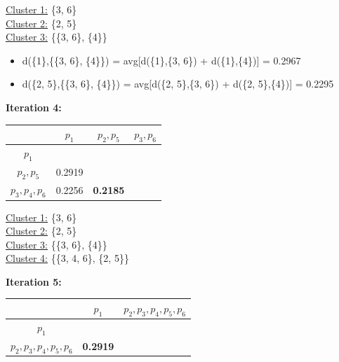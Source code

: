 \documentclass[11pt]{article}
\begin{document}
	\underline{Cluster 1:} \{3, 6\} \\
	\underline{Cluster 2:} \{2, 5\} \\
	\underline{Cluster 3:} \{\{3, 6\}, \{4\}\}
	
	\begin{itemize}
		\item d(\{1\},\{\{3, 6\}, \{4\}\}) = avg[d(\{1\},\{3, 6\}) + d(\{1\},\{4\})] = 0.2967
		\item d(\{2, 5\},\{\{3, 6\}, \{4\}\}) = avg[d(\{2, 5\},\{3, 6\}) + d(\{2, 5\},\{4\})] = 0.2295
	\end{itemize}
	

	\textbf{Iteration 4:}
	
	\begin{center}
    	\begin{adjustbox}{max width=\textwidth}
		\begin{tabular}{ | c | c | c | c |}
	  	 	\hline

	  	 	& \textbf{$p_1$} & \textbf{$p_2, p_5$} & \textbf{$p_3, p_6$}\\
	  	 	\hline
	  	 	
	  	 	\textbf{$p_1$} &  &  &\\
	  	 	\hline
	  	 	
	  	 	\textbf{$p_2, p_5$} & 0.2919 &  &\\
	  	 	\hline
	  	 	
	  	 	\textbf{$p_3, p_4, p_6$} & 0.2256 & \textbf{0.2185} &\\
	  	 	\hline	
    		\end{tabular}
    	\end{adjustbox}
	\end{center}
	
	\underline{Cluster 1:} \{3, 6\} \\
	\underline{Cluster 2:} \{2, 5\} \\
	\underline{Cluster 3:} \{\{3, 6\}, \{4\}\} \\
	\underline{Cluster 4:} \{\{3, 4, 6\}, \{2, 5\}\}

	\textbf{Iteration 5:}
	
	\begin{center}
    	\begin{adjustbox}{max width=\textwidth}
		\begin{tabular}{ | c | c | c|}
	  	 	\hline

	  	 	& \textbf{$p_1$} & \textbf{$p_2, p_3, p_4, p_5, p_6$}\\
	  	 	\hline
	  	 	
	  	 	\textbf{$p_1$} &  &\\
	  	 	\hline
	  	 	
	  	 	\textbf{$p_2, p_3, p_4, p_5, p_6$} & \textbf{0.2919} &\\
	  	 	\hline
    		\end{tabular}
    	\end{adjustbox}
	\end{center}
	
\end{document}
